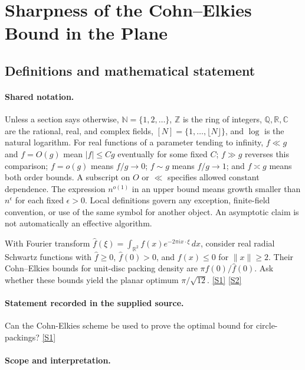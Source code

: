 \documentclass[11pt,a4paper]{article}
\newcommand{\N}{\mathbb{N}}
\newcommand{\Z}{\mathbb{Z}}
\newcommand{\Q}{\mathbb{Q}}
\newcommand{\R}{\mathbb{R}}
\newcommand{\C}{\mathbb{C}}
\newcommand{\sref}[2]{\hyperlink{source:#1:#2}{[S#2]}}
\begin{document}
\section{Sharpness of the Cohn--Elkies Bound in the Plane}\label{statement}


\subsection{Definitions and mathematical statement}

\paragraph{Shared notation.}Unless a section says otherwise, $\N=\{1,2,\ldots\}$,
$\Z$ is the ring of integers, $\Q,\R,\C$ are the rational, real, and complex
fields, $[N]=\{1,\ldots,\lfloor N\rfloor\}$, and $\log$ is the natural
logarithm. For real functions of a parameter tending to infinity,
$f\ll g$ and $f=O(g)$ mean $|f|\leq Cg$ eventually for some fixed $C$;
$f\gg g$ reverses this comparison; $f=o(g)$ means $f/g\to0$;
$f\sim g$ means $f/g\to1$; and $f\asymp g$ means both order bounds.
A subscript on $O$ or $\ll$ specifies allowed constant dependence.
The expression $n^{o(1)}$ in an upper bound means growth smaller than
$n^\epsilon$ for each fixed $\epsilon>0$. Local definitions govern any
exception, finite-field convention, or use of the same symbol for another
object. An asymptotic claim is not automatically an effective algorithm.



With Fourier transform $\widehat f(\xi)=\int_{\R^2}f(x)e^{-2\pi i x\cdot\xi}\,dx$, consider real radial Schwartz functions with $\widehat f\geq0$, $\widehat f(0)>0$, and $f(x)\leq0$ for $\|x\|\geq2$. Their Cohn--Elkies bounds for unit-disc packing density are $\pi f(0)/\widehat f(0)$. Ask whether these bounds yield the planar optimum $\pi/\sqrt{12}$. \sref{statement}{1} \sref{statement}{2}

\paragraph{Statement recorded in the supplied source.}
Can the Cohn-Elkies scheme be used to prove the optimal bound for circle-packings? \sref{statement}{1}

\paragraph{Scope and interpretation.}
\end{document}
